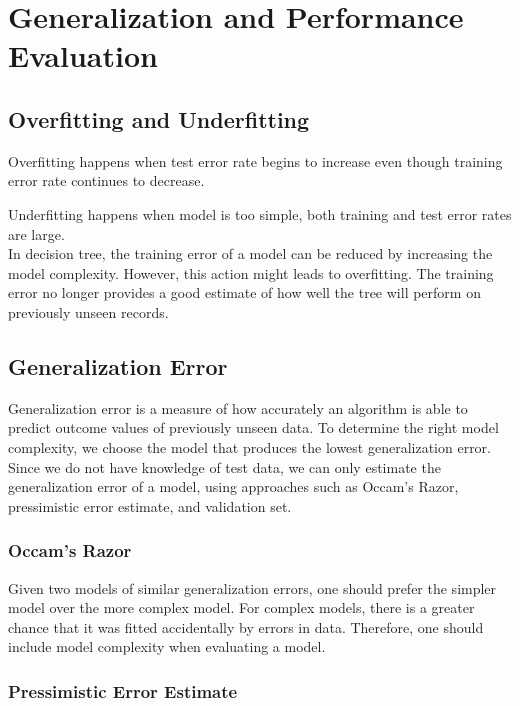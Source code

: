 \chapter{Generalization and Performance Evaluation}

\begin{multicols}{2}

\section{Overfitting and Underfitting}

\noindent Overfitting happens when test error rate begins to increase even though training error rate continues to decrease.

\noindent Underfitting happens when model is too simple, both training and test error rates are large. \\

\noindent In decision tree, the training error of a model can be reduced by increasing the model complexity. However, this action might leads to overfitting. The training error no longer provides a good estimate of how well the tree will perform on previously unseen records.

\section{Generalization Error}

\noindent Generalization error is a measure of how accurately an algorithm is able to predict outcome values of previously unseen data. To determine the right model complexity, we choose the model that produces the lowest generalization error. Since we do not have knowledge of test data, we can only estimate the generalization error of a model, using approaches such as Occam's Razor, pressimistic error estimate, and validation set. \\

\subsection{Occam's Razor}

Given two models of similar generalization errors, one should prefer the simpler model over the more complex model. For complex models, there is a greater chance that it was fitted accidentally by errors in data. Therefore, one should include model complexity when evaluating a model. 

\subsection{Pressimistic Error Estimate}


\end{multicols}
